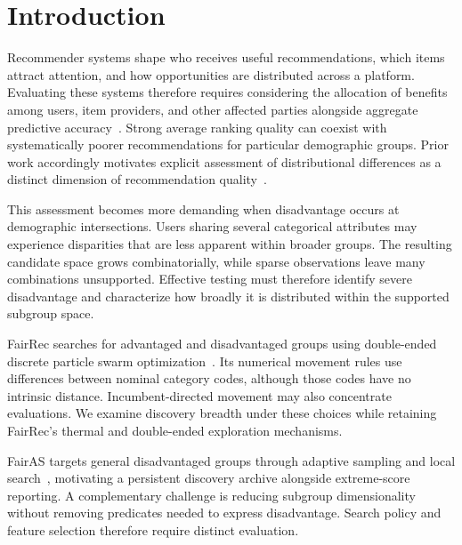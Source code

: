 \documentclass[sigconf,nonacm]{acmart}
\begin{document}

\maketitle

\section{Introduction}
\label{sec:introduction}

Recommender systems shape who receives useful recommendations, which items attract attention, and how opportunities are distributed across a platform. Evaluating these systems therefore requires considering the allocation of benefits among users, item providers, and other affected parties alongside aggregate predictive accuracy~\cite{burke2017multisided,biega2018equity,singh2018fairness}. Strong average ranking quality can coexist with systematically poorer recommendations for particular demographic groups. Prior work accordingly motivates explicit assessment of distributional differences as a distinct dimension of recommendation quality~\cite{yao2017beyond,beutel2019fairness}.

This assessment becomes more demanding when disadvantage occurs at demographic intersections. Users sharing several categorical attributes may experience disparities that are less apparent within broader groups. The resulting candidate space grows combinatorially, while sparse observations leave many combinations unsupported. Effective testing must therefore identify severe disadvantage and characterize how broadly it is distributed within the supported subgroup space.

FairRec searches for advantaged and disadvantaged groups using double-ended discrete particle swarm optimization~\cite{guo2023fairrec}. Its numerical movement rules use differences between nominal category codes, although those codes have no intrinsic distance. Incumbent-directed movement may also concentrate evaluations. We examine discovery breadth under these choices while retaining FairRec's thermal and double-ended exploration mechanisms.

FairAS targets general disadvantaged groups through adaptive sampling and local search~\cite{wu2025nobias}, motivating a persistent discovery archive alongside extreme-score reporting. A complementary challenge is reducing subgroup dimensionality without removing predicates needed to express disadvantage. Search policy and feature selection therefore require distinct evaluation.
\end{document}
